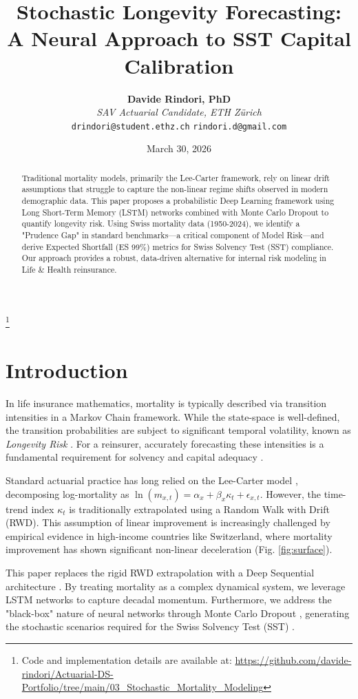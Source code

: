 \documentclass[11pt,a4paper]{article}
\title{\textbf{Stochastic Longevity Forecasting: A Neural Approach to SST Capital Calibration}}
\author{
    \textbf{Davide Rindori, PhD} \\
    \textit{SAV Actuarial Candidate, ETH Zürich} \\
    \texttt{drindori@student.ethz.ch} \quad \texttt{rindori.d@gmail.com}
}
\date{March 30, 2026}
\newcommand{\lnmx}{\ln(m_{x,t})}
\newcommand{\kt}{\kappa_t}
\begin{document}
\maketitle

\begin{abstract}
Traditional mortality models, primarily the Lee-Carter framework, rely on linear drift assumptions that struggle to capture the non-linear regime shifts observed in modern demographic data. This paper proposes a probabilistic Deep Learning framework using Long Short-Term Memory (LSTM) networks combined with Monte Carlo Dropout to quantify longevity risk. Using Swiss mortality data (1950-2024), we identify a "Prudence Gap" in standard benchmarks—a critical component of Model Risk—and derive Expected Shortfall (ES 99\%) metrics for Swiss Solvency Test (SST) compliance. Our approach provides a robust, data-driven alternative for internal risk modeling in Life \& Health reinsurance.
\end{abstract}

\let\thefootnote\relax\footnote{Code and implementation details are available at: \url{https://github.com/davide-rindori/Actuarial-DS-Portfolio/tree/main/03_Stochastic_Mortality_Modeling}}

\section{Introduction}
In life insurance mathematics, mortality is typically described via transition intensities in a Markov Chain framework. While the state-space is well-defined, the transition probabilities are subject to significant temporal volatility, known as \textit{Longevity Risk} \cite{cairns2006two}. For a reinsurer, accurately forecasting these intensities is a fundamental requirement for solvency and capital adequacy \cite{wuthrich2023statistical}.

Standard actuarial practice has long relied on the Lee-Carter model \cite{lee1992modeling}, decomposing log-mortality as $\lnmx = \alpha_x + \beta_x \kt + \epsilon_{x,t}$. However, the time-trend index $\kt$ is traditionally extrapolated using a Random Walk with Drift (RWD). This assumption of linear improvement is increasingly challenged by empirical evidence in high-income countries like Switzerland, where mortality improvement has shown significant non-linear deceleration (Fig. \ref{fig:surface}).

This paper replaces the rigid RWD extrapolation with a Deep Sequential architecture \cite{richman2019lee, perla2021time}. By treating mortality as a complex dynamical system, we leverage LSTM networks to capture decadal momentum. Furthermore, we address the "black-box" nature of neural networks through Monte Carlo Dropout \cite{gal2016dropout}, generating the stochastic scenarios required for the Swiss Solvency Test (SST) \cite{finma2024sst}.
\end{document}

